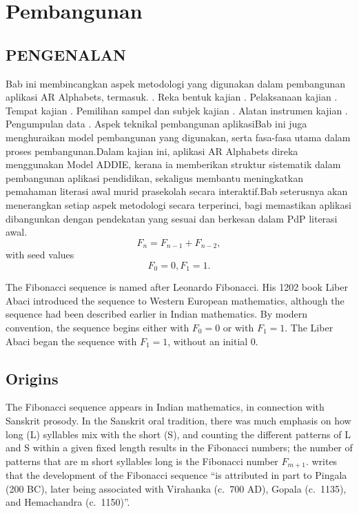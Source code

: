 \chapter{Pembangunan  }
\section{PENGENALAN}


Bab ini membincangkan aspek metodologi yang digunakan dalam pembangunan aplikasi AR Alphabets, termasuk. . Reka bentuk kajian . Pelaksanaan kajian . Tempat kajian . Pemilihan sampel dan subjek kajian . Alatan instrumen kajian . Pengumpulan data . Aspek teknikal pembangunan aplikasiBab ini juga menghuraikan model pembangunan yang digunakan, serta fasa-fasa utama dalam proses pembangunan.Dalam kajian ini, aplikasi AR Alphabets direka menggunakan Model ADDIE, kerana ia memberikan struktur sistematik dalam pembangunan aplikasi pendidikan, sekaligus membantu meningkatkan pemahaman literasi awal murid prasekolah secara interaktif.Bab seterusnya akan menerangkan setiap aspek metodologi secara terperinci, bagi memastikan aplikasi dibangunkan dengan pendekatan yang sesuai dan berkesan dalam PdP literasi awal.
%
\begin{equation}
F_n = F_{n-1} + F_{n-2},
\end{equation}
%
with seed values
%
\begin{equation}
F_0 = 0, F_1 = 1.
\end{equation}

The Fibonacci sequence is named after Leonardo Fibonacci. His 1202 book Liber Abaci introduced the sequence to Western European mathematics, although the sequence had been described earlier in Indian mathematics. \cite{Goonatilake:1998} By modern convention, the sequence begins either with $F_0 = 0$ or with $F_1 = 1$. The Liber Abaci began the sequence with $F_1 = 1$, without an initial 0.


\section{Origins}

The Fibonacci sequence appears in Indian mathematics, in connection with Sanskrit prosody. \cite{Singh:1985} In the Sanskrit oral tradition, there was much emphasis on how long (L) syllables mix with the short (S), and counting the different patterns of L and S within a given fixed length results in the Fibonacci numbers; the number of patterns that are m short syllables long is the Fibonacci number $F_{m + 1}$.
\citet{Goonatilake:1998} writes that the development of the Fibonacci sequence ``is attributed in part to Pingala (200 BC), later being associated with Virahanka (c.~700 AD), Gopala (c.~1135), and Hemachandra (c.~1150)''.

